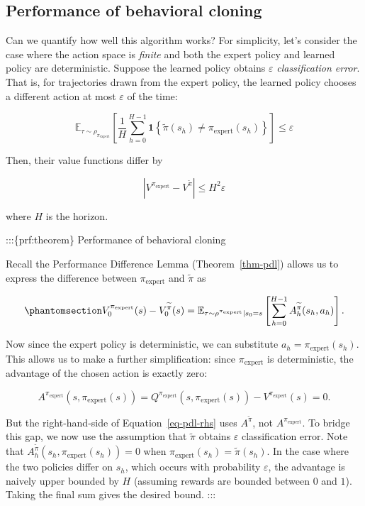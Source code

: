 \documentclass[
  letterpaper,
  DIV=11,
  numbers=noendperiod]{scrreprt}
\theoremstyle{plain}
\theoremstyle{plain}
\theoremstyle{definition}
\theoremstyle{definition}
\theoremstyle{remark}
\begin{document}
\subsection{Performance of behavioral
cloning}\label{performance-of-behavioral-cloning}

Can we quantify how well this algorithm works? For simplicity, let's
consider the case where the action space is \emph{finite} and both the
expert policy and learned policy are deterministic. Suppose the learned
policy obtains \(\varepsilon\) \emph{classification error}. That is, for
trajectories drawn from the expert policy, the learned policy chooses a
different action at most \(\varepsilon\) of the time:

\[
\mathbb{E}_{\tau \sim \rho_{\pi_{\text{expert}}}} \left[ \frac 1 H\sum_{h=0}^{H-1} \mathbf{1}\left\{ \widetilde{\pi}(s_h) \ne \pi_{\text{expert}} (s_h) \right\} \right] \le \varepsilon
\]

Then, their value functions differ by

\[
| V^{\pi_{\text{expert}}} - V^{\widetilde{\pi}} | \le H^2 \varepsilon
\]

where \(H\) is the horizon.

:::\{prf:theorem\} Performance of behavioral cloning

Recall the Performance Difference Lemma (Theorem~\ref{thm-pdl}) allows
us to express the difference between \(\pi_{\text{expert}}\) and
\(\widetilde{\pi}\) as

\begin{equation}\phantomsection\label{eq-pdl-rhs}{
V_0^{\pi_{\text{expert}}}(s) - V_0^{\widetilde{\pi}} (s) = \mathbb{E}_{\tau \sim \rho^{\pi_{\text{expert}}} \mid s_0 = s} \left[ \sum_{h=0}^{H-1} A_h^{\widetilde{\pi}} (s_h, a_h) \right].
}\end{equation}

Now since the expert policy is deterministic, we can substitute
\(a_h= \pi_{\text{expert}}(s_h)\). This allows us to make a further
simplification: since \(\pi_{\text{expert}}\) is deterministic, the
advantage of the chosen action is exactly zero:

\[
A^{\pi_{\text{expert}}}(s, \pi_{\text{expert}}(s)) = Q^{\pi_{\text{expert}}}(s, \pi_{\text{expert}}(s)) - V^{\pi_{\text{expert}}}(s) = 0.
\]

But the right-hand-side of Equation~\ref{eq-pdl-rhs} uses
\(A^{\widetilde{\pi}}\), not \(A^{\pi_{\text{expert}}}\). To bridge this
gap, we now use the assumption that \(\widetilde{\pi}\) obtains
\(\varepsilon\) classification error. Note that
\(A_h^{\widetilde{\pi}}(s_h, \pi_{\text{expert}}(s_h)) = 0\) when
\(\pi_{\text{expert}}(s_h) = \widetilde{\pi}(s_h)\). In the case where
the two policies differ on \(s_h\), which occurs with probability
\(\varepsilon\), the advantage is naively upper bounded by \(H\)
(assuming rewards are bounded between \(0\) and \(1\)). Taking the final
sum gives the desired bound. :::
\end{document}
